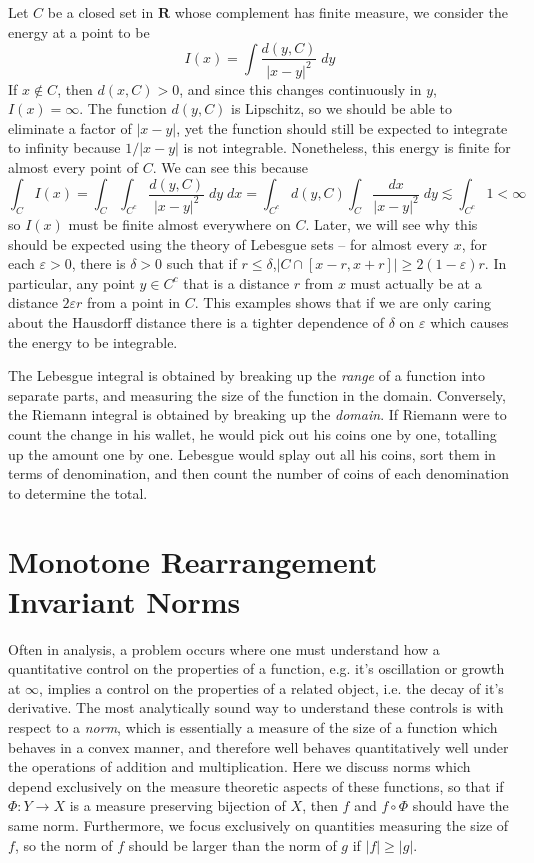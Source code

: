\begin{example}
  Let $C$ be a closed set in $\mathbf{R}$ whose complement has finite measure, we consider the energy at a point to be
  \[ I(x) = \int \frac{d(y,C)}{|x - y|^2}\; dy \]
  If $x \not \in C$, then $d(x,C) > 0$, and since this changes continuously in $y$, $I(x) = \infty$. The function $d(y,C)$ is Lipschitz, so we should be able to eliminate a factor of $|x - y|$, yet the function should still be expected to integrate to infinity because $1/|x-y|$ is not integrable. Nonetheless, this energy is finite for almost every point of $C$. We can see this because
  \[ \int_C I(x) = \int_C \int_{C^c} \frac{d(y,C)}{|x - y|^2}\; dy\; dx = \int_{C^c} d(y,C) \int_C \frac{dx}{|x - y|^2}\; dy \lesssim \int_{C^c} 1 < \infty \]
  so $I(x)$ must be finite almost everywhere on $C$. Later, we will see why this should be expected using the theory of Lebesgue sets -- for almost every $x$, for each $\varepsilon > 0$, there is $\delta > 0$ such that if $r \leq \delta$,$|C \cap [x-r,x+r]| \geq 2(1 - \varepsilon)r$. In particular, any point $y \in C^c$ that is a distance $r$ from $x$ must actually be at a distance $2 \varepsilon r$ from a point in $C$. This examples shows that if we are only caring about the Hausdorff distance there is a tighter dependence of $\delta$ on $\varepsilon$ which causes the energy to be integrable.
\end{example}

The Lebesgue integral is obtained by breaking up the {\it range} of a function into separate parts, and measuring the size of the function in the domain. Conversely, the Riemann integral is obtained by breaking up the {\it domain}. If Riemann were to count the change in his wallet, he would pick out his coins one by one, totalling up the amount one by one. Lebesgue would splay out all his coins, sort them in terms of denomination, and then count the number of coins of each denomination to determine the total.

\section{Monotone Rearrangement Invariant Norms}

Often in analysis, a problem occurs where one must understand how a quantitative control on the properties of a function, e.g. it's oscillation or growth at $\infty$, implies a control on the properties of a related object, i.e. the decay of it's derivative. The most analytically sound way to understand these controls is with respect to a {\it norm}, which is essentially a measure of the size of a function which behaves in a convex manner, and therefore well behaves quantitatively well under the operations of addition and multiplication. Here we discuss norms which depend exclusively on the measure theoretic aspects of these functions, so that if $\Phi: Y \to X$ is a measure preserving bijection of $X$, then $f$ and $f \circ \Phi$ should have the same norm. Furthermore, we focus exclusively on quantities measuring the size of $f$, so the norm of $f$ should be larger than the norm of $g$ if $|f| \geq |g|$.

